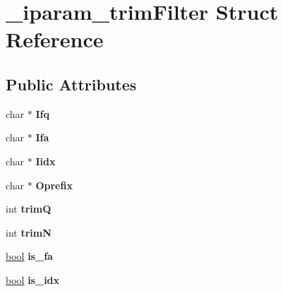 \hypertarget{struct__iparam__trimFilter}{\section{\+\_\+iparam\+\_\+trim\+Filter Struct Reference}
\label{struct__iparam__trimFilter}
}
\subsection*{Public Attributes}
\begin{DoxyCompactItemize}
\item 
\hypertarget{struct__iparam__trimFilter_a5147310738277c148ca7109ba77829ca}{char $\ast$ {\bfseries Ifq}}\label{struct__iparam__trimFilter_a5147310738277c148ca7109ba77829ca}

\item 
\hypertarget{struct__iparam__trimFilter_a55796cd412ef4ca61a5a799d2f64beec}{char $\ast$ {\bfseries Ifa}}\label{struct__iparam__trimFilter_a55796cd412ef4ca61a5a799d2f64beec}

\item 
\hypertarget{struct__iparam__trimFilter_a158296e4d37ab3b033c6f9aee1516d71}{char $\ast$ {\bfseries Iidx}}\label{struct__iparam__trimFilter_a158296e4d37ab3b033c6f9aee1516d71}

\item 
\hypertarget{struct__iparam__trimFilter_ad24f2902b532a4ff2dfb1122941064b8}{char $\ast$ {\bfseries Oprefix}}\label{struct__iparam__trimFilter_ad24f2902b532a4ff2dfb1122941064b8}

\item 
\hypertarget{struct__iparam__trimFilter_a5b5344041c9313230de07c9485227203}{int {\bfseries trim\+Q}}\label{struct__iparam__trimFilter_a5b5344041c9313230de07c9485227203}

\item 
\hypertarget{struct__iparam__trimFilter_a5f2d247cc26608ed5cc9e2d6943940d7}{int {\bfseries trim\+N}}\label{struct__iparam__trimFilter_a5f2d247cc26608ed5cc9e2d6943940d7}

\item 
\hypertarget{struct__iparam__trimFilter_ac6093d26e41e61f82ffd2aa05f563f9c}{\hyperlink{defines_8h_abb452686968e48b67397da5f97445f5b}{bool} {\bfseries is\+\_\+fa}}\label{struct__iparam__trimFilter_ac6093d26e41e61f82ffd2aa05f563f9c}

\item 
\hypertarget{struct__iparam__trimFilter_afc50c477a3340ed7befc430d273ff6cb}{\hyperlink{defines_8h_abb452686968e48b67397da5f97445f5b}{bool} {\bfseries is\+\_\+idx}}\label{struct__iparam__trimFilter_afc50c477a3340ed7befc430d273ff6cb}


\end{DoxyCompactItemize}
